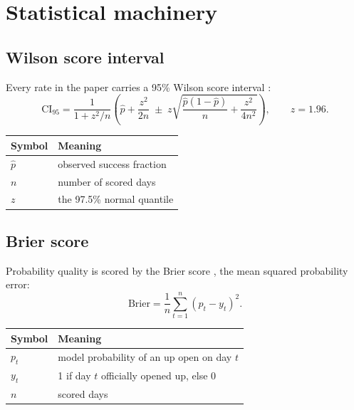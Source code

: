 \section{Statistical machinery}
\label{app:selection}

\subsection{Wilson score interval}
\label{app:wilson}

Every rate in the paper carries a 95\% Wilson score interval
\citep{wilson1927}:
\begin{equation}
\mathrm{CI}_{95} = \frac{1}{1 + z^2/n}\left(\hat p + \frac{z^2}{2n}
\;\pm\; z\sqrt{\frac{\hat p(1-\hat p)}{n} + \frac{z^2}{4n^2}}\right),
\qquad z = 1.96.
\label{eq:wilson}
\end{equation}

\begin{center}
\small
\begin{tabular}{ll}
\toprule
Symbol & Meaning \\
\midrule
$\hat p$ & observed success fraction \\
$n$ & number of scored days \\
$z$ & the 97.5\% normal quantile \\
\bottomrule
\end{tabular}
\end{center}

\subsection{Brier score}
\label{app:brier}

Probability quality is scored by the Brier score \citep{brier1950}, the
mean squared probability error:
\begin{equation}
\mathrm{Brier} = \frac{1}{n}\sum_{t=1}^{n}\left(p_t - y_t\right)^2.
\label{eq:brier}
\end{equation}

\begin{center}
\small
\begin{tabular}{ll}
\toprule
Symbol & Meaning \\
\midrule
$p_t$ & model probability of an up open on day $t$ \\
$y_t$ & 1 if day $t$ officially opened up, else 0 \\
$n$ & scored days \\
\bottomrule
\end{tabular}
\end{center}

